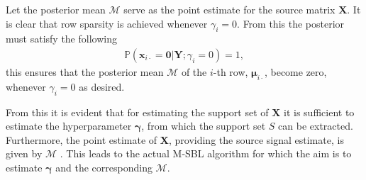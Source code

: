 Let the posterior mean $\mathcal{M}$ serve as the point estimate for the source matrix $\mathbf{X}$.
It is clear that row sparsity is achieved whenever $\gamma_i = 0$. 
From this the posterior must satisfy the following 
\begin{align*}
\mathbb{P}(\mathbf{x}_{i \cdot} = \mathbf{0} \vert \mathbf{Y} ; \gamma_i = 0) = 1,
\end{align*}
this ensures that the posterior mean $\mathcal{M}$ of the $i$-th row, $\boldsymbol{\mu}_{i \cdot}$, become zero, whenever $\gamma_i = 0$ as desired.

From this it is evident that for estimating the support set of $\mathbf{X}$ it is sufficient to estimate the hyperparameter $\boldsymbol{\gamma}$, from which the support set $S$ can be extracted. Furthermore, the point estimate of $\mathbf{X}$, providing the source signal estimate, is given by $\mathcal{M}$ \cite[p. 147]{phd_wipf}. 
This leads to the actual M-SBL algorithm for which the aim is to estimate $\boldsymbol{\gamma}$ and the corresponding $\mathcal{M}$.


